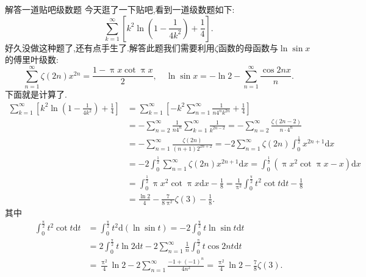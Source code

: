 \documentclass[UTF8,no-math,12pt,openany,table,dvipsnames,svgnames]{book}
\renewcommand{\pi}{\uppi}
\begin{document}
\begin{MYBOX}[colbacktitle=cyan]{解答一道贴吧级数题}
今天逛了一下贴吧,看到一道级数题如下:
\[\sum_{k=1}^\infty\left[k^2\ln\left(1-\frac1{4k^2}\right)+\frac14\right].\]
好久没做这种题了,还有点手生了.解答此题我们需要利用$\zeta$函数的母函数与$\ln\sin x$的傅里叶级数:
\[\sum_{n=1}^\infty\zeta(2n)x^{2n}=\frac{1-\pi x\cot\pi x}2,\quad\ln\sin x=-\ln2-\sum_{n=1}^\infty\frac{\cos2nx}n.\]
下面就是计算了.
\begin{align*}
\sum_{k=1}^{\infty}{\left[ k^2\ln \left( 1-\frac{1}{4k^2} \right) +\frac{1}{4} \right]}&=\sum_{k=1}^{\infty}{\left[ -k^2\sum_{n=1}^{\infty}{\frac{1}{n4^nk^{2n}}}+\frac{1}{4} \right]}\\
&=-\sum_{n=2}^{\infty}{\frac{1}{n4^n}\sum_{k=1}^{\infty}{\frac{1}{k^{2n-2}}}}=-\sum_{n=2}^{\infty}{\frac{\zeta \left( 2n-2 \right)}{n\cdot 4^n}}\\
&=-\sum_{n=1}^{\infty}{\frac{\zeta \left( 2n \right)}{\left( n+1 \right) 2^{2n+2}}}=-2\sum_{n=1}^{\infty}{\zeta \left( 2n \right) \int_0^{\frac{1}{2}}{x^{2n+1}\text{d}x}}\\
&=-2\int_0^{\frac{1}{2}}{\sum_{n=1}^{\infty}{\zeta \left( 2n \right) x^{2n+1}}\text{d}x}=\int_0^{\frac{1}{2}}{\left( \pi x^2\cot \pi x-x \right) \text{d}x}\\
&=\int_0^{\frac{1}{2}}{\pi x^2\cot \pi x\text{d}x}-\frac{1}{8}=\frac{1}{\pi ^2}\int_0^{\frac{\pi}{2}}{t^2\cot t\text{d}t}-\frac{1}{8}\\
&=\frac{\ln2}4-\frac7{8\pi^2}\zeta(3)-\frac18.
\end{align*}
其中
\begin{align*}
\int_0^{\frac{\pi}{2}}{t^2\cot t\text{d}t}&=\int_0^{\frac{\pi}{2}}{t^2\text{d}\left( \ln\sin t \right)}=-2\int_0^{\frac{\pi}{2}}{t\ln\sin t\text{d}t}\\
&=2\int_0^{\frac{\pi}{2}}{t\ln 2\text{d}t}-2\sum_{n=1}^{\infty}{\frac{1}{n}}\int_0^{\frac{\pi}{2}}{t\cos 2nt\text{d}t}\\
&=\frac{\pi ^2}{4}\ln 2-2\sum_{n=1}^{\infty}{\frac{-1+\left( -1 \right) ^n}{4n^2}}=\frac{\pi ^2}{4}\ln 2-\frac{7}{8}\zeta \left( 3 \right).
\end{align*}

\end{MYBOX}
\end{document}
